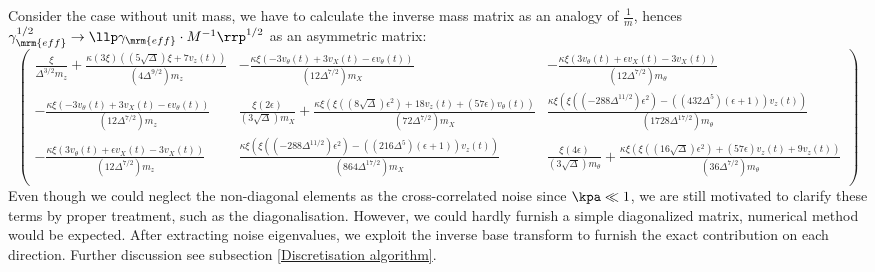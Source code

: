 Consider the case without unit mass, we have to calculate the inverse mass matrix as an analogy of $\frac{1}{m}$, hences $\gamma_{\mrm{eff}}^{1/2} \to \llp \gamma_{\mrm{eff}} \cdot M^{-1} \rrp^{1/2}$ as an asymmetric matrix:
$$ \left( \begin{array}{ccc} \frac{\xi }{\Delta ^{3/2} m_z}+\frac{\kappa  (3 \xi ) \left(\left(5 \sqrt{\Delta }\right) \xi +7 v_z(t)\right)}{\left(4 \Delta ^{9/2}\right) m_z} & -\frac{\kappa  \xi  \left(-3 v_{\theta }(t)+3 v_X(t)-\epsilon  v_{\theta }(t)\right)}{\left(12 \Delta ^{7/2}\right) m_X} & -\frac{\kappa  \xi  \left(3 v_{\theta }(t)+\epsilon  v_X(t)-3 v_X(t)\right)}{\left(12 \Delta ^{7/2}\right) m_{\theta }} \\ -\frac{\kappa  \xi  \left(-3 v_{\theta }(t)+3 v_X(t)-\epsilon  v_{\theta }(t)\right)}{\left(12 \Delta ^{7/2}\right) m_z} & \frac{\xi  (2 \epsilon )}{\left(3 \sqrt{\Delta }\right) m_X}+\frac{\kappa  \xi  \left(\xi  \left(\left(8 \sqrt{\Delta }\right) \epsilon ^2\right)+18 v_z(t)+(57 \epsilon ) v_{\theta }(t)\right)}{\left(72 \Delta ^{7/2}\right) m_X} & \frac{\kappa  \xi  \left(\xi  \left(\left(-288 \Delta ^{11/2}\right) \epsilon ^2\right)-\left(\left(432 \Delta ^5\right) (\epsilon +1)\right) v_z(t)\right)}{\left(1728 \Delta ^{17/2}\right) m_{\theta }} \\ -\frac{\kappa  \xi  \left(3 v_{\theta }(t)+\epsilon  v_X(t)-3 v_X(t)\right)}{\left(12 \Delta ^{7/2}\right) m_z} & \frac{\kappa  \xi  \left(\xi  \left(\left(-288 \Delta ^{11/2}\right) \epsilon ^2\right)-\left(\left(216 \Delta ^5\right) (\epsilon +1)\right) v_z(t)\right)}{\left(864 \Delta ^{17/2}\right) m_X} & \frac{\xi  (4 \epsilon )}{\left(3 \sqrt{\Delta }\right) m_{\theta }}+\frac{\kappa  \xi  \left(\xi  \left(\left(16 \sqrt{\Delta }\right) \epsilon ^2\right)+(57 \epsilon ) v_z(t)+9 v_z(t)\right)}{\left(36 \Delta ^{7/2}\right) m_{\theta }} \\ \end{array} \right) $$
Even though we could neglect the non-diagonal elements as the cross-correlated noise since $\kpa \ll 1$, we are still motivated to clarify these terms by proper treatment, such as the diagonalisation. However, we could hardly furnish a simple diagonalized matrix, numerical method would be expected. After extracting noise eigenvalues, we exploit the inverse base transform to furnish the exact contribution on each direction. Further discussion see subsection \ref{Discretisation algorithm}.


